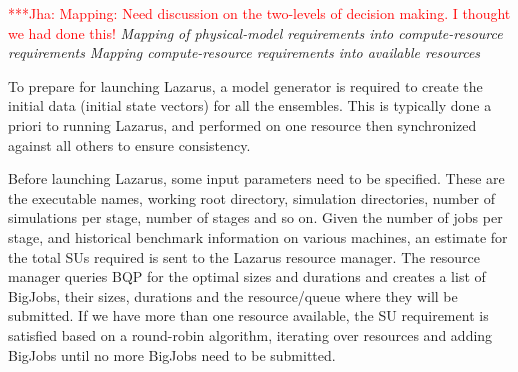 \documentclass[conference,final]{IEEEtran}
\newcommand{\jhanote}[1]{ {\textcolor{red} { ***Jha: #1 }}}
\newcommand{\jhanote}[1]{}
\begin{document}

\jhanote{Mapping: Need discussion on the two-levels of decision
  making. I thought we had done this!}  {\it Mapping of physical-model
  requirements into compute-resource requirements} {\it Mapping
  compute-resource requirements into available resources}

To prepare for launching Lazarus, a model generator is required to
create the initial data (initial state vectors) for all the
ensembles. This is typically done a priori to running Lazarus, and
performed on one resource then synchronized against all others to
ensure consistency.

Before launching Lazarus, some input parameters need to be specified.
These are the executable names, working root directory, simulation
directories, number of simulations per stage, number of stages and so
on. Given the number of jobs per stage, and historical benchmark
information on various machines, an estimate for the total SUs
required is sent to the Lazarus resource manager. The resource manager
queries BQP for the optimal sizes and durations and creates a list of
BigJobs, their sizes, durations and the resource/queue where they will
be submitted. If we have more than one resource available, the SU
requirement is satisfied based on a round-robin algorithm, iterating
over resources and adding BigJobs until no more BigJobs need to be
submitted.
\end{document}
